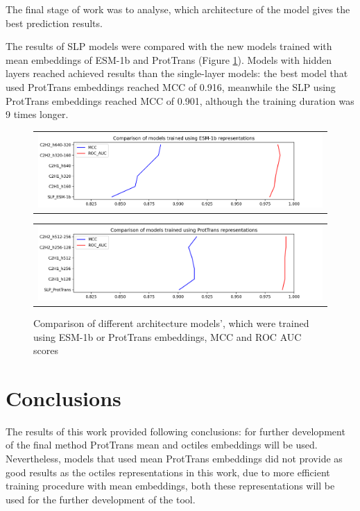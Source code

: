 \documentclass[12pt]{article}
\begin{document}
	The final stage of work was to analyse, which architecture of the
	model gives the best prediction results.

	The results of SLP models were compared with the new models 
	trained with mean embeddings of ESM-1b and ProtTrans (Figure 
	\ref{figure:scoresMLP_ESMandPT}). Models with 
	hidden layers reached achieved results than the single-layer 
	models: the best model that used ProtTrans embeddings reached
	MCC of 0.916, meanwhile the SLP using ProtTrans embeddings 
	reached MCC of 0.901, although the training duration was 9 times 
	longer.

	\begin{figure}[h!]
		\centering
		\begin{tabular}{@{}c@{}}
			\includegraphics[scale=0.6]{MLP_ESM.png}
		\end{tabular}

		\begin{tabular}{@{}c@{}}
			\includegraphics[scale=0.6]{MLP_PT.png}
		\end{tabular}
		
		\caption{Comparison of different architecture models', which were trained using 
		ESM-1b or ProtTrans embeddings, MCC and ROC AUC scores}
		\label{figure:scoresMLP_ESMandPT}
	\end{figure}

	\newpage

	\section{Conclusions}

	The results of this work provided following conclusions: for 
	further development of the final method ProtTrans mean and 
	octiles embeddings will be used. Nevertheless, models that used 
	mean ProtTrans embeddings did not provide as good results as 
	the octiles representations in this work, due to more efficient 
	training 
	procedure with mean embeddings, both these representations will 
	be used for the further development of the tool.
	
\end{document}
